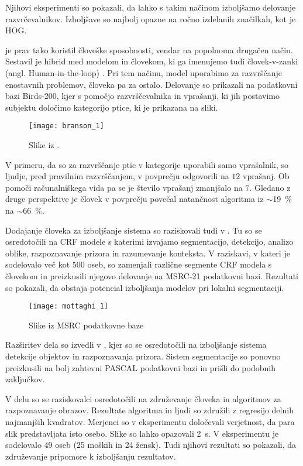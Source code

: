 Njihovi eksperimenti so pokazali, da lahko s takim načinom izboljšamo delovanje razvrčevalnikov. Izboljšave so najbolj opazne na ročno izdelanih značilkah, kot je HOG.  

 je prav tako koristil človeške sposobnosti, vendar na popolnoma drugačen način. Sestavil je hibrid med modelom in človekom, ki ga imenujemo tudi človek-v-zanki (angl. Human-in-the-loop) \cite{branson2010visual}. Pri tem načinu, model uporabimo za razvrščanje enostavnih problemov, človeka pa za ostalo. Delovanje so prikazali na podatkovni bazi Birds-200, kjer s pomočjo razvrščevalnika in vprašanji, ki jih postavimo subjektu določimo kategorijo ptice, ki je prikazana na sliki. 

\begin{figure}[!htbp]
	\centering
	\texttt{[image: branson\_1]}
	\caption{Slike iz \cite{welinder2010caltech}.}
\end{figure}

V primeru, da so za razvrščanje ptic v kategorije uporabili samo vprašalnik, so ljudje, pred pravilnim razvrščanjem, v povprečju odgovorili na $12$ vprašanj. Ob pomoči računalniškega vida pa se je število vprašanj zmanjšalo na $7$. Gledano z druge perspektive je človek v povprečju povečal natančnost algoritma iz $\sim$\SI{19}{\%} na $\sim$\SI{66}{\%}. 

Dodajanje človeka za izboljšanje sistema so raziskovali tudi v \cite{mottaghi2013analysing}. Tu so se osredotočili na CRF modele s katerimi izvajamo segmentacijo, detekcijo, analizo oblike, razpoznavanje prizora in razumevanje konteksta. V raziskavi, v kateri je sodelovalo več kot $500$ oseb, so zamenjali različne segmente CRF modela s človekom in preizkusili njegovo delovanje na MSRC-21 podatkovni bazi. Rezultati so pokazali, da obstaja potencial izboljšanja modelov pri lokalni segmentaciji.

\begin{figure}[!htbp]
	\centering
	\texttt{[image: mottaghi\_1]}
	\caption{Slike iz MSRC podatkovne baze \cite{shotton2006textonboost}}
\end{figure}

Razširitev dela \cite{mottaghi2013analysing} so izvedli v \cite{mottaghi2016human}, kjer so se osredotočili na izboljšanje sistema detekcije objektov in razpoznavanja prizora. Sistem segmentacije so ponovno preizkusili na bolj zahtevni PASCAL podatkovni bazi in prišli do podobnih zaključkov. 


V delu  \cite{otoole2007fusing} so se raziskovalci osredotočili na združevanje človeka in algoritmov za razpoznavanje obrazov. Rezultate algoritma in ljudi so združili z regresijo delnih najmanjših kvadratov. Merjenci so v eksperimentu določevali verjetnost, da para slik predstavljata isto osebo. Slike so lahko opazovali \SI{2}{\s}. V eksperimentu je sodelovalo $49$ oseb (25 moških in 24 žensk). Tudi njihovi rezultati so pokazali, da združevanje pripomore k izboljšanju rezultatov. 

